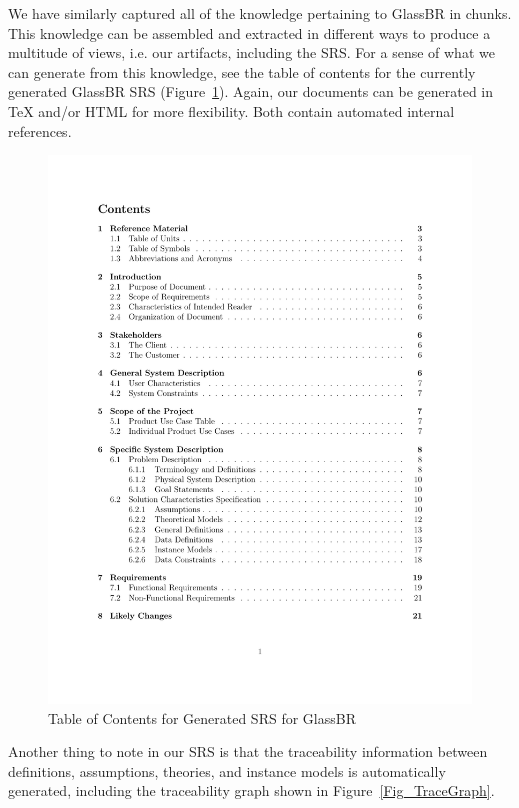 \documentclass[sigconf]{acmart}
\begin{document}
We have similarly captured all of the knowledge pertaining to GlassBR in chunks.
This knowledge can be assembled and extracted in different ways to produce a 
multitude of views, i.e. our artifacts, including the SRS. For a sense of what 
we can generate from this knowledge, see the table of contents for the currently
generated GlassBR SRS (Figure~\ref{Fig_ToCGlassBRSRS}). Again, our documents can
be generated in TeX and/or HTML for more flexibility. Both contain automated 
internal references.

\begin{figure}
\begin{center}
\includegraphics[scale=0.5]{./figures/TofC.pdf}
\end{center}
\caption{Table of Contents for Generated SRS for GlassBR}
\label{Fig_ToCGlassBRSRS}
\end{figure}

Another thing to note in our SRS is that the traceability information between
definitions, assumptions, theories, and instance models is automatically 
generated, including the traceability graph shown in 
Figure~\ref{Fig_TraceGraph}.
\end{document}
